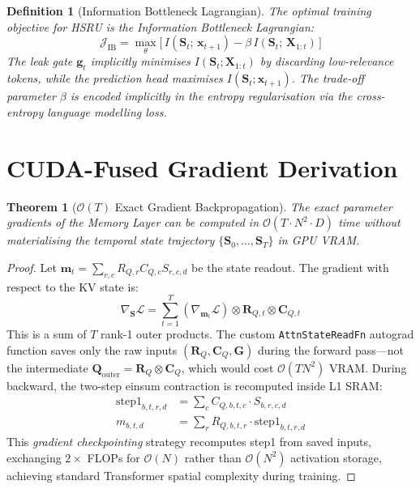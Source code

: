 \documentclass[11pt]{article}
\newtheorem{theorem}{Theorem}[section]
\newtheorem{definition}{Definition}[section]
\begin{document}
\begin{definition}[Information Bottleneck Lagrangian]
The optimal training objective for HSRU is the Information Bottleneck Lagrangian:
\begin{equation}
    \mathcal{J}_{\mathrm{IB}} = \max_\theta \big[\, I(\mathbf{S}_t;\, \mathbf{x}_{t+1}) - \beta\, I(\mathbf{S}_t;\, \mathbf{X}_{1:t})\, \big]
\end{equation}
The leak gate $\mathbf{g}_t$ implicitly minimises $I(\mathbf{S}_t; \mathbf{X}_{1:t})$ by discarding low-relevance tokens, while the prediction head maximises $I(\mathbf{S}_t; \mathbf{x}_{t+1})$. The trade-off parameter $\beta$ is encoded implicitly in the entropy regularisation via the cross-entropy language modelling loss.
\end{definition}

\section{CUDA-Fused Gradient Derivation}

\begin{theorem}[$\mathcal{O}(T)$ Exact Gradient Backpropagation]
The exact parameter gradients of the Memory Layer can be computed in $\mathcal{O}(T \cdot N^2 \cdot D)$ time without materialising the temporal state trajectory $\{\mathbf{S}_0, \dots, \mathbf{S}_T\}$ in GPU VRAM.
\end{theorem}
\begin{proof}
Let $\mathbf{m}_t = \sum_{r,c} R_{Q,r} C_{Q,c} S_{r,c,d}$ be the state readout. The gradient with respect to the KV state is:
\begin{equation}
    \nabla_{\mathbf{S}} \mathcal{L} = \sum_{t=1}^T \left(\nabla_{\mathbf{m}_t} \mathcal{L}\right) \otimes \mathbf{R}_{Q,t} \otimes \mathbf{C}_{Q,t}
\end{equation}
This is a sum of $T$ rank-1 outer products. The custom \texttt{AttnStateReadFn} autograd function saves only the raw inputs $(\mathbf{R}_Q, \mathbf{C}_Q, \mathbf{G})$ during the forward pass—not the intermediate $\mathbf{Q}_{\mathrm{outer}} = \mathbf{R}_Q \otimes \mathbf{C}_Q$, which would cost $\mathcal{O}(T N^2)$ VRAM. During backward, the two-step einsum contraction is recomputed inside L1 SRAM:
\begin{align}
    \text{step1}_{b,t,r,d} &= \sum_c C_{Q,b,t,c} \cdot S_{b,r,c,d} \\
    m_{b,t,d} &= \sum_r R_{Q,b,t,r} \cdot \text{step1}_{b,t,r,d}
\end{align}
This \emph{gradient checkpointing} strategy recomputes step1 from saved inputs, exchanging $2\times$ FLOPs for $\mathcal{O}(N)$ rather than $\mathcal{O}(N^2)$ activation storage, achieving standard Transformer spatial complexity during training.
\end{proof}
\end{document}
